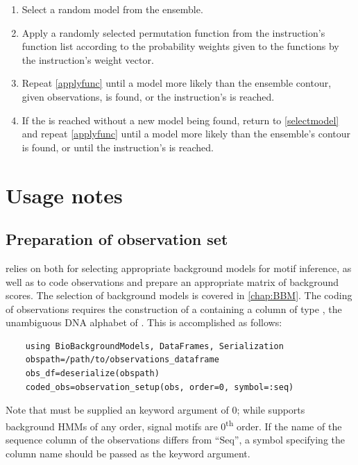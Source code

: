 \documentclass{ut-thesis}
\begin{document}
\begin{NoHyper}
\begin{enumerate}
    \item\label{selectmodel} Select a random  model from the ensemble.
    \item\label{applyfunc} Apply a randomly selected permutation function from the instruction's function list according to the probability weights given to the functions by the instruction's weight vector.
    \item Repeat \ref{applyfunc} until a model more likely than the ensemble contour, given observations, is found, or the instruction's  is reached.
    \item If the  is reached without a new model being found, return to \ref{selectmodel} and repeat \ref{applyfunc} until a model more likely than the ensemble's contour is found, or until the instruction's  is reached.
\end{enumerate}

\section{Usage notes}
\subsection{Preparation of observation set}
 relies on  both for selecting appropriate background models for motif inference, as well as to code observations and prepare an appropriate matrix of background scores. The selection of background models is covered in \autoref{chap:BBM}. The coding of observations requires the construction of a  containing a column of type , the unambiguous DNA alphabet of . This is accomplished as follows:

\begin{verbatim}
    using BioBackgroundModels, DataFrames, Serialization
    obspath=/path/to/observations_dataframe
    obs_df=deserialize(obspath)
    coded_obs=observation_setup(obs, order=0, symbol=:seq)\end{verbatim}

Note that  must be supplied an  keyword argument of 0; while  supports background HMMs of any order, signal motifs are 0\textsuperscript{th} order. If the name of the sequence column of the observations  differs from ``Seq'', a symbol specifying the column name should be passed as the  keyword argument.


\end{NoHyper}
\end{document}
